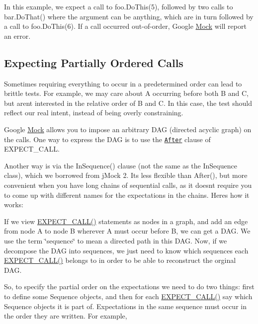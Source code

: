 In this example, we expect a call to {\ttfamily foo.\+Do\+This(5)}, followed by two calls to {\ttfamily bar.\+Do\+That()} where the argument can be anything, which are in turn followed by a call to {\ttfamily foo.\+Do\+This(6)}. If a call occurred out-\/of-\/order, Google \hyperlink{class_mock}{Mock} will report an error.

\subsection*{Expecting Partially Ordered Calls}

Sometimes requiring everything to occur in a predetermined order can lead to brittle tests. For example, we may care about {\ttfamily A} occurring before both {\ttfamily B} and {\ttfamily C}, but aren\textquotesingle{}t interested in the relative order of {\ttfamily B} and {\ttfamily C}. In this case, the test should reflect our real intent, instead of being overly constraining.

Google \hyperlink{class_mock}{Mock} allows you to impose an arbitrary D\+AG (directed acyclic graph) on the calls. One way to express the D\+AG is to use the \href{CheatSheet.md#the-after-clause}{\tt After} clause of {\ttfamily E\+X\+P\+E\+C\+T\+\_\+\+C\+A\+LL}.

Another way is via the {\ttfamily In\+Sequence()} clause (not the same as the {\ttfamily In\+Sequence} class), which we borrowed from j\+Mock 2. It\textquotesingle{}s less flexible than {\ttfamily After()}, but more convenient when you have long chains of sequential calls, as it doesn\textquotesingle{}t require you to come up with different names for the expectations in the chains. Here\textquotesingle{}s how it works\+:

If we view {\ttfamily \hyperlink{gmock-spec-builders_8h_a535a6156de72c1a2e25a127e38ee5232}{E\+X\+P\+E\+C\+T\+\_\+\+C\+A\+L\+L()}} statements as nodes in a graph, and add an edge from node A to node B wherever A must occur before B, we can get a D\+AG. We use the term \char`\"{}sequence\char`\"{} to mean a directed path in this D\+AG. Now, if we decompose the D\+AG into sequences, we just need to know which sequences each {\ttfamily \hyperlink{gmock-spec-builders_8h_a535a6156de72c1a2e25a127e38ee5232}{E\+X\+P\+E\+C\+T\+\_\+\+C\+A\+L\+L()}} belongs to in order to be able to reconstruct the orginal D\+AG.

So, to specify the partial order on the expectations we need to do two things\+: first to define some {\ttfamily Sequence} objects, and then for each {\ttfamily \hyperlink{gmock-spec-builders_8h_a535a6156de72c1a2e25a127e38ee5232}{E\+X\+P\+E\+C\+T\+\_\+\+C\+A\+L\+L()}} say which {\ttfamily Sequence} objects it is part of. Expectations in the same sequence must occur in the order they are written. For example,


